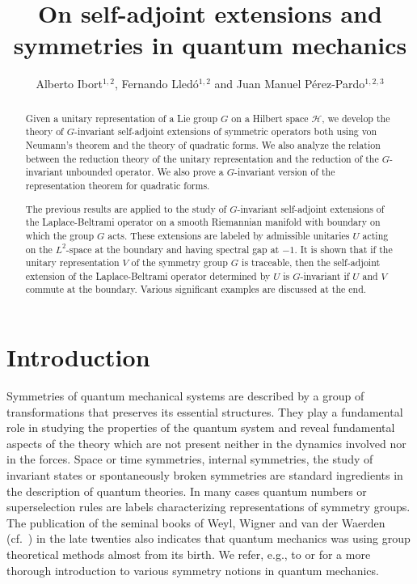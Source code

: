\documentclass[a4paper,12pt]{amsart}
\title{
On self-adjoint extensions and symmetries in quantum mechanics
}
\date{}
\author{Alberto Ibort$^{1,2}$, Fernando Lled\'{o}$^{1,2}$ and Juan Manuel P\'erez-Pardo$^{1,2,3}$}
\newcommand{\1}{\mathbb{I}}
\numberwithin{equation}{section}
\numberwithin{theorem}{section}
\begin{document}
\begin{abstract}
Given a unitary representation of a Lie group $G$ on a Hilbert space $\mathcal H$, we develop the theory of 
$G$-invariant self-adjoint extensions of symmetric operators both using von Neumann's theorem and the theory of quadratic forms. 
We also analyze the relation between the reduction theory of the unitary representation and the reduction of the 
$G$-invariant unbounded operator. We also prove a $G$-invariant version of the representation theorem for quadratic forms. 

The previous results are applied to the study of $G$-invariant
self-adjoint extensions of the Laplace-Beltrami operator on a smooth Riemannian manifold with boundary on which
the group $G$ acts. These extensions are labeled by admissible unitaries $U$ acting on the $L^2$-space at the boundary and having
spectral gap at $-1$.
It is shown that if the unitary representation $V$ of the symmetry group $G$ is traceable, then the self-adjoint extension of the 
Laplace-Beltrami operator determined by $U$ is $G$-invariant if $U$ and $V$ commute at the boundary. Various significant examples are discussed at the end.
\end{abstract}

\maketitle

\tableofcontents



\section{Introduction}


Symmetries of quantum mechanical systems are described by a group of transformations that preserves its essential structures. 
They play a fundamental role in studying the properties of the quantum system and reveal
fundamental aspects of the theory which are not present neither in the dynamics involved nor in the forces.
Space or time symmetries, internal symmetries, the study of invariant states or spontaneously broken symmetries
are standard ingredients in the description of quantum theories.
In many cases quantum numbers or superselection rules are labels characterizing representations of symmetry groups.
The publication of the seminal books of Weyl, Wigner and
van der Waerden (cf.~\cite{bWeyl28,bWigner31,bWaerden32}) in the late twenties
also indicates that quantum mechanics was using group theoretical methods
almost from its birth. We refer, e.g., to \cite[Chapter~12]{moretti13} or \cite{simon76}
for a more thorough introduction to various symmetry notions in quantum mechanics.
\end{document}
